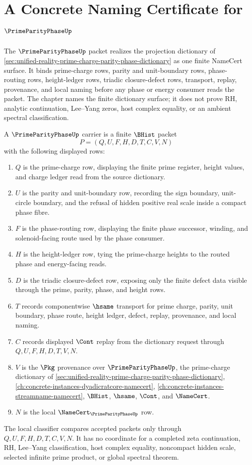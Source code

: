 \chapter{A Concrete Naming Certificate for $\PrimeParityPhaseUp$}
\label{ch:concrete-instances-prime-parity-phase-namecert}

The $\PrimeParityPhaseUp$ packet realizes the projection dictionary of \autoref{sec:unified-reality-prime-charge-parity-phase-dictionary} as one finite NameCert surface. It binds prime-charge rows, parity and unit-boundary rows, phase-routing rows, height-ledger rows, triadic closure-defect rows, transport, replay, provenance, and local naming before any phase or energy consumer reads the packet. The chapter names the finite dictionary surface; it does not prove RH, analytic continuation, Lee--Yang zeros, host complex equality, or an ambient spectral classification.

\begin{definition}
\label{def:prime-parity-phase-carrier}
A $\PrimeParityPhaseUp$ carrier is a finite $\BHist$ packet
$$
P=(Q,U,F,H,D,T,C,V,N)
$$
with the following displayed rows:
\begin{enumerate}
\item $Q$ is the prime-charge row, displaying the finite prime register, height values, and charge ledger read from the source dictionary.
\item $U$ is the parity and unit-boundary row, recording the sign boundary, unit-circle boundary, and the refusal of hidden positive real scale inside a compact phase fibre.
\item $F$ is the phase-routing row, displaying the finite phase successor, winding, and solenoid-facing route used by the phase consumer.
\item $H$ is the height-ledger row, tying the prime-charge heights to the routed phase and energy-facing reads.
\item $D$ is the triadic closure-defect row, exposing only the finite defect data visible through the prime, parity, phase, and height rows.
\item $T$ records componentwise $\hsame$ transport for prime charge, parity, unit boundary, phase route, height ledger, defect, replay, provenance, and local naming.
\item $C$ records displayed $\Cont$ replay from the dictionary request through $Q,U,F,H,D,T,V,N$.
\item $V$ is the $\Pkg$ provenance over $\PrimeParityPhaseUp$, the prime-charge dictionary of \autoref{sec:unified-reality-prime-charge-parity-phase-dictionary}, \autoref{ch:concrete-instances-dyadicratcore-namecert}, \autoref{ch:concrete-instances-streamname-namecert}, $\BHist$, $\hsame$, $\Cont$, and $\NameCert$.
\item $N$ is the local $\NameCert_{\PrimeParityPhaseUp}$ row.
\end{enumerate}
The local classifier compares accepted packets only through $Q,U,F,H,D,T,C,V,N$. It has no coordinate for a completed zeta continuation, RH, Lee--Yang classification, host complex equality, noncompact hidden scale, selected infinite prime product, or global spectral theorem.
\end{definition}

